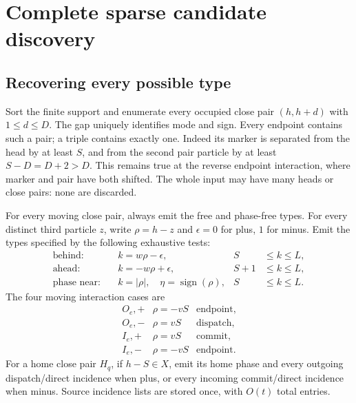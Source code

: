 \documentclass[11pt,a4paper]{article}
\numberwithin{equation}{section}
\begin{document}
\section{Complete sparse candidate discovery}\label{fpa:sp:sec:discovery}
\subsection{Recovering every possible type}
Sort the finite support and enumerate every occupied close pair $(h,h+d)$ with $1\le d\le D$. The gap uniquely identifies mode and sign. Every endpoint contains such a pair; a triple contains exactly one. Indeed its marker is separated from the head by at least $S$, and from the second pair particle by at least $S-D=D+2>D$. This remains true at the reverse endpoint interaction, where marker and pair have both shifted. The whole input may have many heads or close pairs: none are discarded.

For every moving close pair, always emit the free and phase-free types. For every distinct third particle $z$, write $\rho=h-z$ and $\epsilon=0$ for plus, $1$ for minus. Emit the types specified by the following exhaustive tests:
\begin{align*}
\text{behind:}\quad &k=w\rho-\epsilon, & S&\le k\le L,\\
\text{ahead:}\quad &k=-w\rho+\epsilon, & S+1&\le k\le L,\\
\text{phase near:}\quad &k=|\rho|,\quad\eta=\operatorname{sign}(\rho),& S&\le k\le L.
\end{align*}
The four moving interaction cases are
\[
\begin{array}{ccl}
O_e,+&\rho=-vS&\text{endpoint},\\
O_e,-&\rho= vS&\text{dispatch},\\
I_e,+&\rho= vS&\text{commit},\\
I_e,-&\rho=-vS&\text{endpoint}.
\end{array}
\]
For a home close pair $H_q$, if $h-S\in X$, emit its home phase and every outgoing dispatch/direct incidence when plus, or every incoming commit/direct incidence when minus. Source incidence lists are stored once, with $O(t)$ total entries.
\end{document}
